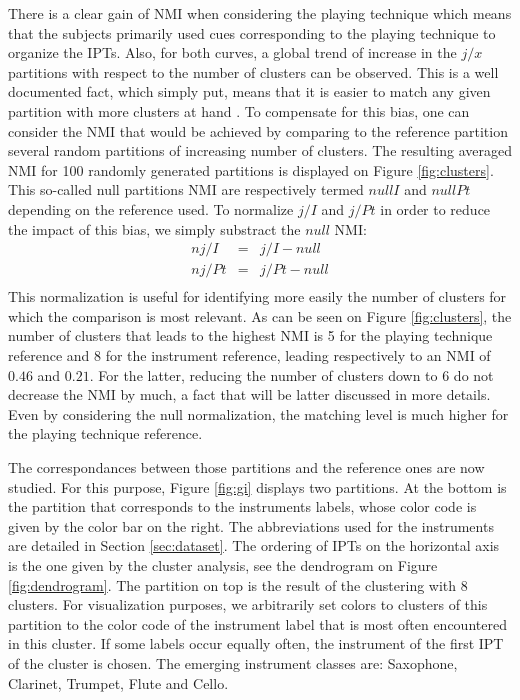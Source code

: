 \documentclass{article}
\newcommand{\ipt}{IPT\xspace}
\newcommand{\ipts}{IPTs\xspace}
\begin{document}
There is a clear gain of NMI when considering the playing technique which means that the subjects primarily used cues corresponding to the playing technique to organize the \ipts. Also, for both curves, a global trend of increase in the $j/x$ partitions with respect to the number of clusters can be observed. This is a well documented fact, which simply put, means that it is easier to match any given partition with more clusters at hand \cite{tibshirani2001estimating}. To compensate for this bias, one can consider the NMI that would be achieved by comparing to the reference partition several random partitions of increasing number of clusters. The resulting averaged NMI for 100 randomly generated partitions is displayed on Figure \ref{fig:clusters}. This so-called null partitions NMI are respectively termed $nullI$ and $nullPt$ depending on the reference used. To normalize $j/I$ and $j/Pt$ in order to reduce the impact of this bias, we simply substract the $null$ NMI:
\begin{eqnarray}
  nj/I &=& j/I - null \\
  nj/Pt &=& j/Pt - null  \\
\end{eqnarray}
This normalization is useful for identifying more easily the number of clusters for which the comparison is most relevant. As can be seen on Figure \ref{fig:clusters}, the number of clusters that leads to the highest NMI is 5 for the playing technique reference and 8 for the instrument reference, leading respectively to an NMI of $0.46$ and $0.21$. For the latter, reducing the number of clusters down to 6 do not decrease the NMI by much, a fact that will be latter discussed in more details. Even by considering the null normalization, the matching level is much higher for the playing technique reference.

The correspondances between those partitions and the reference ones are now studied. For this purpose, Figure \ref{fig:gi} displays two partitions. At the bottom is the partition that corresponds to the instruments labels, whose color code is given by the color bar on the right. The abbreviations used for the instruments are detailed in Section \ref{sec:dataset}. The ordering of \ipts on the horizontal axis is the one given by the cluster analysis, see the dendrogram on Figure \ref{fig:dendrogram}. The partition on top is the result of the clustering with 8 clusters. For visualization purposes, we arbitrarily set colors to clusters of this partition to the color code of the instrument label that is most often encountered in this cluster. If some labels occur equally often, the instrument of the first \ipt of the cluster is chosen. The emerging instrument classes are: Saxophone, Clarinet, Trumpet, Flute and Cello.
\end{document}
